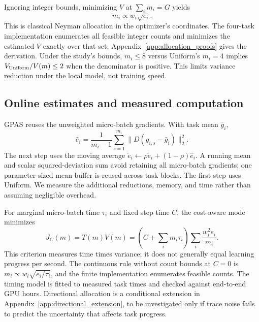 Ignoring integer bounds, minimizing $V$ at $\sum_i m_i=G$ yields
\begin{equation}
    m_i\propto w_i\sqrt{e_i}.
    \label{eq:batch_gpas_allocation}
\end{equation}
This is classical Neyman allocation
\citep{neyman1934representative,cochran1977sampling} in the optimizer's
coordinates. The four-task implementation enumerates all feasible
integer counts and minimizes the estimated $V$ exactly over that set;
Appendix~\ref{app:allocation_proofs} gives the derivation. Under the
study's bounds, $m_i\leq8$ versus Uniform's $m_i=4$ implies
$V_{\rm Uniform}/V(m)\leq2$ when the denominator is positive.
This limits variance reduction under the local model, not training speed.

\subsection{Online estimates and measured computation}
\label{sec:online_estimates}

GPAS reuses the unweighted micro-batch gradients. With task mean $\bar g_i$,
\begin{equation}
    \widehat e_i=\frac1{m_i-1}\sum_{s=1}^{m_i}
                    \|D(g_{i,s}-\bar g_i)\|_2^2.
    \label{eq:noise_estimate}
\end{equation}
The next step uses the moving average
$\widetilde e_i\leftarrow\rho\widetilde e_i+(1-\rho)\widehat e_i$.
A running mean and scalar squared-deviation sum avoid retaining all
micro-batch gradients; one parameter-sized mean buffer is reused across
task blocks. The first step uses Uniform. We measure the additional
reductions, memory, and time rather than assuming negligible overhead.

For marginal micro-batch time $\tau_i$ and fixed step time $C$, the
cost-aware mode minimizes
\begin{equation}
    J_C(m)=T(m)V(m)
      =\left(C+\sum_i m_i\tau_i\right)
         \sum_i\frac{w_i^2e_i}{m_i}.
    \label{eq:batch_cost_objective}
\end{equation}
This criterion measures time times variance; it does not generally equal
learning progress per second. The continuous rule without count bounds at
$C=0$ is $m_i\propto w_i\sqrt{e_i/\tau_i}$, and the finite implementation
enumerates feasible counts. The timing model is fitted to measured task
times and checked against end-to-end GPU hours. Directional allocation
is a conditional extension in Appendix~\ref{app:directional_extension},
to be investigated only if trace noise fails to predict the uncertainty
that affects task progress.

